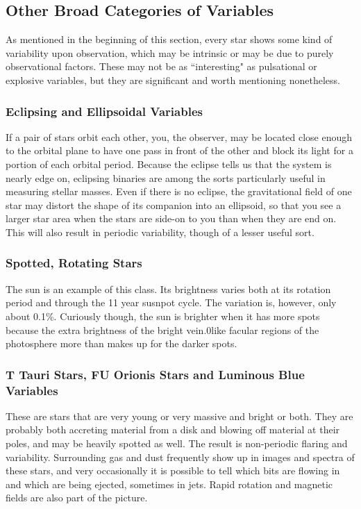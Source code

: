 \subsection{Other Broad Categories of Variables}
As mentioned in the beginning of this section, every star shows some kind of variability upon observation, which may be intrinsic or may be due to purely observational factors. These may not be as ``interesting" as pulsational or explosive variables, but they are significant and worth mentioning nonetheless.
\subsubsection{Eclipsing and Ellipsoidal Variables}
If a pair of stars orbit each other, you, the observer, may be located close enough to the orbital plane to have one pass in front of the other and block its light for a portion of each orbital period. Because the eclipse tells us that the system is nearly edge on, eclipsing binaries are among the sorts particularly useful in measuring stellar masses. Even if there is no eclipse, the gravitational field of one star may distort the shape of its companion into an ellipsoid, so that you see a larger star area when the stars are side-on to you than when they are end on. This will also result in periodic variability, though of a lesser useful sort.
\subsubsection{Spotted, Rotating Stars}
The sun is an example of this class. Its brightness varies both at its rotation period and through the 11 year susnpot cycle. The variation is, however, only about 0.1\%. Curiously though, the sun is brighter when it has more spots because the extra brightness of the bright vein.0like facular regions of the photosphere more than makes up for the darker spots.
\subsubsection{T Tauri Stars, FU Orionis Stars and Luminous Blue Variables}
These are stars that are very young or very massive and bright or both. They are probably both accreting material from a disk and blowing off material at their poles, and may be heavily spotted as well. The result is non-periodic flaring and variability. Surrounding gas and dust frequently show up in images and spectra of these stars, and very occasionally it is possible to tell which bits are flowing in and which are being ejected, sometimes in jets. Rapid rotation and magnetic fields are also part of the picture.
